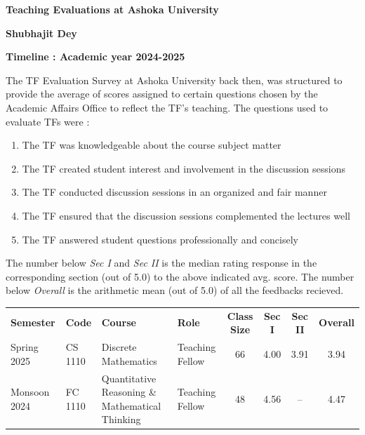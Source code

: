 \documentclass[12pt]{article}
\begin{document}
\begin{center}
    \Large{\textbf{Teaching Evaluations at Ashoka University}}\\
    \medskip

    \large{\textbf{Shubhajit Dey}}
\end{center}

\textbf{Timeline : Academic year 2024-2025}

The TF Evaluation Survey at Ashoka University back then, was structured to provide
the average of scores assigned to certain questions chosen by the Academic Affairs
Office to reflect the TF's teaching. The questions used to evaluate
TFs were :
\begin{enumerate}[noitemsep]
    \item The TF was knowledgeable about the course subject matter
    \item The TF created student interest and involvement in the discussion sessions
    \item The TF conducted discussion sessions in an organized and fair manner
    \item The TF ensured that the discussion sessions complemented the lectures well
    \item The TF answered student questions professionally and concisely
\end{enumerate}
The number below \textit{Sec I} and \textit{Sec II} is the median rating response
in the corresponding section (out of 5.0) to the above indicated avg. score. The number
below \textit{Overall} is the arithmetic mean (out of 5.0) of all the feedbacks
recieved.
\begin{table}[H]
    \centering
    \begin{tabular}{llllcccc}
        \rowcolor{paynes.gray!20}
        \textbf{Semester} & \textbf{Code}& \textbf{Course} & \textbf{Role} & \textbf{Class Size} & \textbf{Sec I} & \textbf{Sec II} & \textbf{Overall}\\
        Spring 2025 & CS 1110 & Discrete Mathematics & Teaching Fellow & 66 & 4.00 & 3.91 & 3.94\\
        Monsoon 2024 & FC 1110 & Quantitative Reasoning \& Mathematical Thinking & Teaching Fellow & 48 & 4.56 & -- & 4.47
    \end{tabular}
\end{table}
\end{document}
